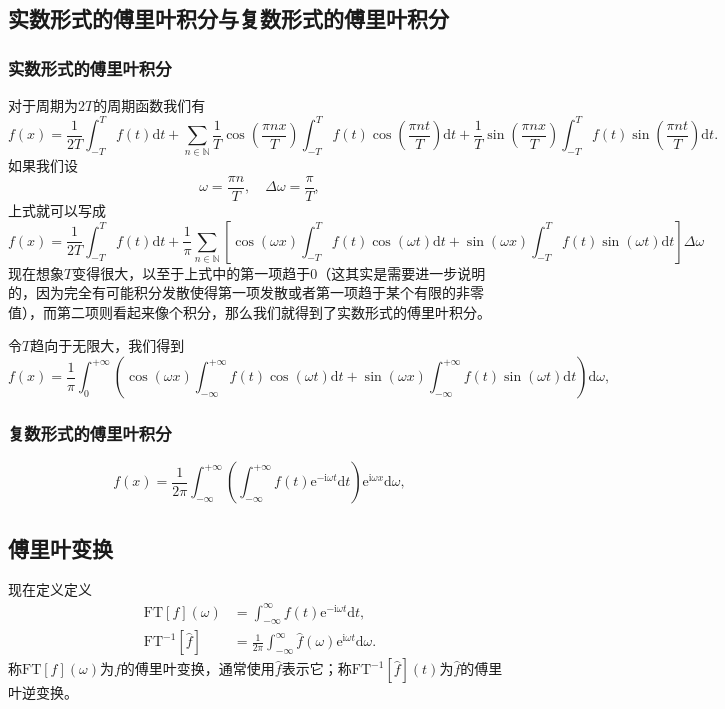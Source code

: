 \documentclass[UTF8]{ctexart}
\newcommand*{\natnums}{\mathbb{N}}
\newcommand*{\ee}{\mathrm{e}}
\begin{document}
\subsection{实数形式的傅里叶积分与复数形式的傅里叶积分}

\subsubsection{实数形式的傅里叶积分}

对于周期为$2T$的周期函数我们有
\[
f(x) = \frac{1}{2T} \int_{-T}^{T} f(t) \mathrm{d}t + 
\sum_{n \in \natnums} \frac{1}{T} \cos \left( \frac{\pi n x}{T} \right) \int_{-T}^{T} f(t) \cos \left( \frac{\pi n t}{T} \right) \mathrm{d}t +
\frac{1}{T} \sin \left( \frac{\pi n x}{T} \right) \int_{-T}^{T} f(t) \sin \left( \frac{\pi n t}{T} \right) \mathrm{d}t.
\]
如果我们设
\[
\omega = \frac{\pi n}{T}, \quad \Delta \omega = \frac{\pi}{T},
\]
上式就可以写成
\[
f(x) = \frac{1}{2T} \int_{-T}^{T} f(t) \mathrm{d}t +
\frac{1}{\pi} \sum_{n \in \natnums} \left[ \cos(\omega x) \int_{-T}^{T} f(t) \cos(\omega t) \mathrm{d}t + \sin(\omega x) \int_{-T}^{T} f(t) \sin(\omega t) \mathrm{d}t \right] \Delta \omega
\]
现在想象$T$变得很大，以至于上式中的第一项趋于0（这其实是需要进一步说明的，因为完全有可能积分发散使得第一项发散或者第一项趋于某个有限的非零值），而第二项则看起来像个积分，那么我们就得到了实数形式的傅里叶积分。

令$T$趋向于无限大，我们得到
\[
f(x) = \frac{1}{\pi}\int_0^{+\infty} \left(
    \cos(\omega x) \int_{-\infty}^{+\infty} f(t) \cos(\omega t) \mathrm{d}t
    +  \sin(\omega x) \int_{-\infty}^{+\infty} f(t) \sin(\omega t) \mathrm{d}t
\right) \mathrm{d}\omega,
\]

\subsubsection{复数形式的傅里叶积分}

\[
f(x) = \frac{1}{2\pi} \int_{-\infty}^{+\infty} \left(\int_{-\infty}^{+\infty} f(t) \ee^{-\mathrm{i} \omega t} \mathrm{d}t \right) \ee^{\mathrm{i} \omega x} \mathrm{d} \omega,
\]

\subsection{傅里叶变换}

现在定义定义
\[
\begin{aligned}
    \mathrm{FT}[f](\omega) &= \int_{-\infty}^\infty f(t) \ee^{-\mathrm{i}\omega t} \mathrm{d}t, \\
    \mathrm{FT}^{-1}[\hat{f}] &= \frac{1}{2\pi} \int_{-\infty}^\infty \hat{f}(\omega) \ee^{\mathrm{i}\omega t} \mathrm{d}\omega.
\end{aligned}
\]
称$\mathrm{FT}[f](\omega)$为$f$的傅里叶变换，通常使用$\hat{f}$表示它；称$\mathrm{FT}^{-1}[\hat{f}](t)$为$\hat{f}$的傅里叶逆变换。
\end{document}
